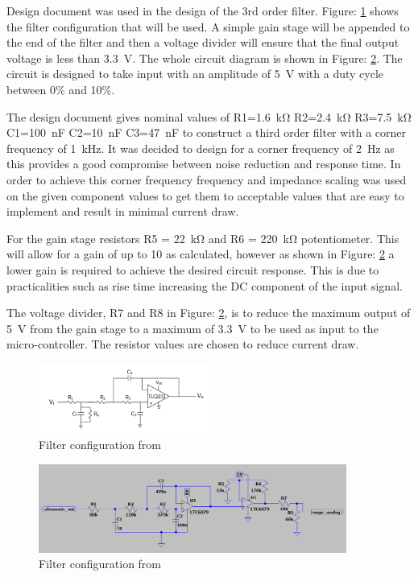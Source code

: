 Design document \cite{Design_SonicSens_Filter} was used in the design of the 3rd order filter. Figure: \ref{fig:sonicsens_filter} shows the filter configuration that will be used. A simple gain stage will be appended to the end of the filter and then a voltage divider will ensure that the final output voltage is less than \SI{3.3}{\volt}. The whole circuit diagram is shown in Figure: \ref{fig:sonicsens_diag}. The circuit is designed to take input with an amplitude of \SI{5}{\volt} with a duty cycle between 0\% and 10\%.

The design document gives nominal values of R1=\SI{1.6}{\kilo\ohm} R2=\SI{2.4}{\kilo\ohm}  R3=\SI{7.5}{\kilo\ohm} C1=\SI{100}{\nano\farad} C2=\SI{10}{\nano\farad} C3=\SI{47}{\nano\farad} to construct a third order filter with a  corner frequency of \SI{1}{\kilo\hertz}. It was decided to design for a corner frequency of \SI{2}{\hertz} as this provides a good compromise between noise reduction and response time. In order to achieve this corner frequency frequency and impedance scaling was used on the given component values to get them to acceptable values that are easy to implement and result in minimal current draw. 


For the gain stage resistors R5 = \SI{22}{\kilo\ohm} and R6 = \SI{220}{\kilo\ohm} potentiometer. This will allow for a gain of up to 10 as calculated, however as shown in Figure: \ref{fig:sonicsens_diag} a lower gain is required to achieve the desired circuit response. This is due to practicalities such as rise time increasing the DC component of the input signal.


The voltage divider, R7 and R8 in Figure: \ref{fig:sonicsens_diag}, is to reduce the maximum output of \SI{5}{\volt} from the gain stage to a maximum of \SI{3.3}{\volt} to be used as input to the micro-controller. The resistor values are chosen to reduce current draw.

\begin{figure}
\centering
\includegraphics[width=0.5\textwidth]{./Figures/SonicSens_Filter.png}
\caption{Filter configuration from \cite{Design_SonicSens_Filter}}
\label{fig:sonicsens_filter}
\end{figure}

\begin{figure}
\centering
\includegraphics[width=0.9\textwidth]{./Figures/SonicSens_Diagram.png}
\caption{Filter configuration from \cite{Design_SonicSens_Filter}}
\label{fig:sonicsens_diag}
\end{figure}

